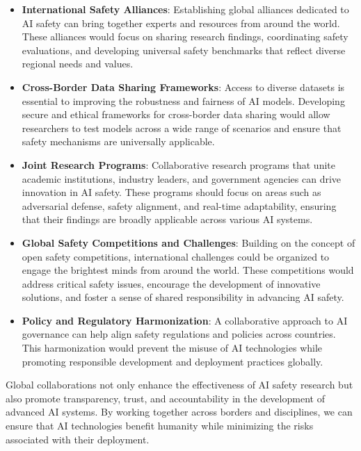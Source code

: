 \begin{itemize} 
    \item \textbf{International Safety Alliances}: Establishing global alliances dedicated to AI safety can bring together experts and resources from around the world. These alliances would focus on sharing research findings, coordinating safety evaluations, and developing universal safety benchmarks that reflect diverse regional needs and values.
    
    \item \textbf{Cross-Border Data Sharing Frameworks}: Access to diverse datasets is essential to improving the robustness and fairness of AI models. Developing secure and ethical frameworks for cross-border data sharing would allow researchers to test models across a wide range of scenarios and ensure that safety mechanisms are universally applicable.

    \item \textbf{Joint Research Programs}: Collaborative research programs that unite academic institutions, industry leaders, and government agencies can drive innovation in AI safety. These programs should focus on areas such as adversarial defense, safety alignment, and real-time adaptability, ensuring that their findings are broadly applicable across various AI systems.
    
    \item \textbf{Global Safety Competitions and Challenges}: Building on the concept of open safety competitions, international challenges could be organized to engage the brightest minds from around the world. These competitions would address critical safety issues, encourage the development of innovative solutions, and foster a sense of shared responsibility in advancing AI safety.
    
    \item \textbf{Policy and Regulatory Harmonization}: A collaborative approach to AI governance can help align safety regulations and policies across countries. This harmonization would prevent the misuse of AI technologies while promoting responsible development and deployment practices globally.
    
\end{itemize}

Global collaborations not only enhance the effectiveness of AI safety research but also promote transparency, trust, and accountability in the development of advanced AI systems. By working together across borders and disciplines, we can ensure that AI technologies benefit humanity while minimizing the risks associated with their deployment.
